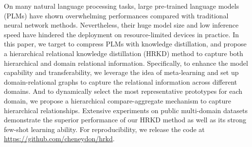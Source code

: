 On many natural language processing tasks, large pre-trained language models (PLMs) have shown overwhelming performances compared with traditional neural network methods. Nevertheless, their huge model size and low inference speed have hindered the deployment on resource-limited devices in practice. In this paper, we target to compress PLMs with knowledge distillation, and propose a hierarchical relational knowledge distillation (HRKD) method to capture both hierarchical and domain relational information. Specifically, to enhance the model capability and transferability, we leverage the idea of meta-learning and set up domain-relational graphs to capture the relational information across different domains. And to dynamically select the most representative prototypes for each domain, we propose a hierarchical compare-aggregate mechanism to capture hierarchical relationships. Extensive experiments on public multi-domain datasets demonstrate the superior performance of our HRKD method as well as its strong few-shot learning ability. For reproducibility, we release the code at \url{https://github.com/cheneydon/hrkd}.
